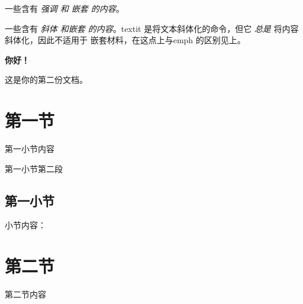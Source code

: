 \documentclass{ctexart}
\begin{document}
一些含有 \emph{强调 和 \emph{嵌套} 的内容}。

一些含有 \textit{斜体 和\textit{嵌套} 的内容}。textit
是将文本斜体化的命令，但它 \emph{总是} 将内容斜体化，因此不适用于
嵌套材料，在这点上与emph 的区别见上。

\textbf{你好！}

这是你的第二份文档。

\section{第一节}

第一小节内容

第一小节第二段

\subsection{第一小节}

小节内容：

\section{第二节}

第二节内容
\end{document}
